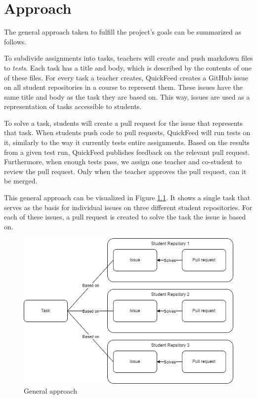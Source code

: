 
\chapter{Approach}
\label{ch:approach}

The general approach taken to fulfill the project's goals can be summarized as follows.

To subdivide assignments into tasks, teachers will create and push markdown files to \textit{tests}.
Each task has a title and body, which is described by the contents of one of these files.
For every task a teacher creates, QuickFeed creates a GitHub issue on all student repositories in a course to represent them.
These issues have the same title and body as the task they are based on.
This way, issues are used as a representation of tasks accessible to students.

To solve a task, students will create a pull request for the issue that represents that task.
When students push code to pull requests, QuickFeed will run tests on it, similarly to the way it currently tests entire assignments.
Based on the results from a given test run, QuickFeed publishes feedback on the relevant pull request.
Furthermore, when enough tests pass, we assign one teacher and co-student to review the pull request.
Only when the teacher approves the pull request, can it be merged.

This general approach can be visualized in Figure \ref{fig:approach}.
It shows a single task that serves as the basis for individual issues on three different student repositories.
For each of these issues, a pull request is created to solve the task the issue is based on.

\begin{figure}[ht]
    \centering
    \includegraphics[scale=0.5]{photos/approach.png}
    \caption{General approach}
    \label{fig:approach}
\end{figure}


